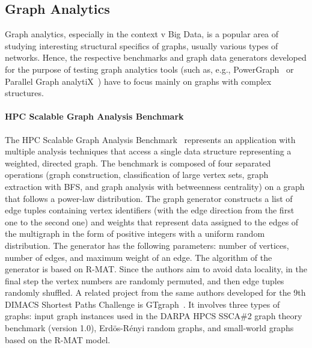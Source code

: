 \subsection{Graph Analytics}
\label{sec:generators_analytics}

Graph analytics, especially in the context v Big Data, is a popular area of studying interesting structural specifics of graphs, usually various types of networks.  Hence, the respective benchmarks and graph data generators developed for the purpose of testing graph analytics tools (such as, e.g.,  PowerGraph~\cite{Gonzalez:2012:PDG:2387880.2387883} or Parallel Graph analytiX~\cite{Sevenich:2016:UDL:3007263.3007265}) have to focus mainly on graphs with complex structures.

\paragraph{HPC Scalable Graph Analysis Benchmark} The HPC Scalable Graph
Analysis Benchmark~\cite{HPCgraph,Bader:2005:DIH:2099301.2099360} represents an
application with multiple analysis techniques that access a single data
structure representing a weighted, directed graph. The benchmark is composed of
four separated operations (graph construction, classification of large vertex
sets, graph extraction with BFS, and graph analysis with betweenness centrality)
on a graph that follows a power-law distribution. The graph generator constructs a list of edge tuples containing vertex
identifiers (with the edge direction from the first one to the second one) and
weights that represent data assigned to the edges of the multigraph in the form
of positive integers with a uniform random distribution. The generator has the
following parameters: number of vertices, number of edges, and maximum weight of
an edge. The algorithm of the generator is based on R-MAT. Since the authors aim
to avoid data locality, in the final step the vertex numbers are randomly
permuted, and then edge tuples randomly shuffled. A related project from the same authors developed for the 9th DIMACS Shortest
Paths Challenge is GTgraph~\cite{GTgraph}. It involves three types of graphs:
input graph instances used in the DARPA HPCS SSCA\#2 graph theory benchmark
(version 1.0), Erd\"{o}s-R\'{e}nyi random graphs, and small-world graphs based
on the R-MAT model.


